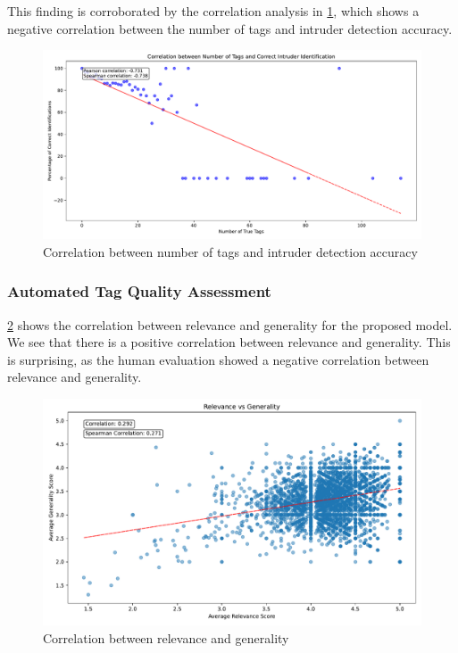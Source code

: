 This finding is corroborated by the correlation analysis in \cref{fig:gpt_correlation_num_tags}, which shows a negative correlation between the number of tags and intruder detection accuracy.

\begin{figure}[h]
    \centering
    \includegraphics[width=\textwidth]{figures/gpt_correlation_num_tags.pdf}
    \caption{Correlation between number of tags and intruder detection accuracy}
    \label{fig:gpt_correlation_num_tags}
\end{figure}

\subsubsection{Automated Tag Quality Assessment}
\cref{fig:gpt_relevance_vs_generality} shows the correlation between relevance and generality for the proposed model. We see that there is a positive correlation between relevance and generality. This is surprising, as the human evaluation showed a negative correlation between relevance and generality.

\begin{figure}[h]
    \centering
    \includegraphics[width=\textwidth]{figures/gpt_relevance_vs_generality.pdf}
    \caption{Correlation between relevance and generality}
    \label{fig:gpt_relevance_vs_generality}
\end{figure}


